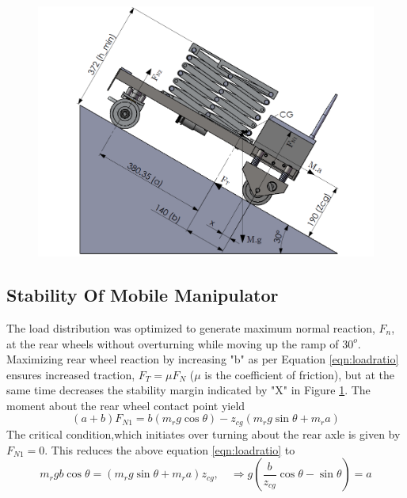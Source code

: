    \begin{figure}[h]
   	\centering
   	\includegraphics[width=0.85\linewidth,keepaspectratio]{Chapter3/fig/loadDist}
   	\label{fig:loadDistribution}
   \end{figure}
\subsection{Stability Of Mobile Manipulator}
  The load distribution was optimized to generate maximum normal reaction, $F_n$,  at the rear wheels without overturning while moving up the ramp of $30^o$. Maximizing rear wheel reaction by increasing  "b" as per Equation \ref{eqn:loadratio} ensures increased traction, $F_T=\mu F_N$ ($\mu$ is the coefficient of friction), but at the same time decreases the stability margin indicated by "X" in Figure \ref{fig:loadDistribution}. The  moment about the rear wheel contact point yield
\begin{equation}
\label{eqn:loadratio}
(a+b)F_{N1}=b(m_r g\cos\theta)-z_{cg}(m_r g\sin\theta+m_r a)
\end{equation}
The critical condition,which  initiates over turning about the rear axle is given by $F_{N1} =0$.  This reduces the above equation \ref{eqn:loadratio} to 
\begin{equation}
\label{eqn:overturn}
m_rgb\cos\theta=(m_rg\sin\theta+m_ra)z_{cg}, \quad \Rightarrow g(\frac{b}{z_{cg}}\cos\theta-\sin\theta)=a
\end{equation}

 

